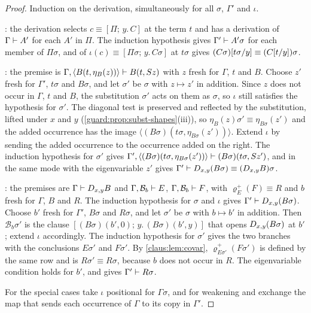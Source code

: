 \begin{proof}
Induction on the derivation, simultaneously for all $\sigma$, $\Gamma'$
and $\iota$.

: the derivation selects $c\equiv[\Pi;\,y.\,C]$ at the term
$t$ and has a derivation of $\Gamma\vdash A'$ for each $A'$ in $\Pi$. The
induction hypothesis gives $\Gamma'\vdash A'\sigma$ for each member of
$\Pi\sigma$, and  of $\iota(c)\equiv[\Pi\sigma;\,y.\,C\sigma]$
at $t\sigma$ gives $(C\sigma)[t\sigma/y]\equiv(C[t/y])\sigma$.

: the premise is
$\Gamma,\langle B(t,\eta_B(z))\rangle\vdash B(t,S z)$ with $z$ fresh
for $\Gamma$, $t$ and $B$. Choose $z'$ fresh for $\Gamma'$, $t\sigma$ and
$B\sigma$, and let $\sigma'$ be $\sigma$ with $z\mapsto z'$ in addition.
Since $z$ does not occur in $\Gamma$, $t$ and $B$, the substitution
$\sigma'$ acts on them as $\sigma$, so $\iota$ still satisfies the
hypothesis for $\sigma'$. The diagonal test is preserved and reflected by
the substitution, lifted under $x$ and $y$
(\cref{guard:prop:subst-shapes}(iii)), so
$\eta_B(z)\sigma'\equiv\eta_{B\sigma}(z')$ and the added occurrence has the
image $\langle(B\sigma)(t\sigma,\eta_{B\sigma}(z'))\rangle$. Extend
$\iota$ by sending the added occurrence to the occurrence added on the
right. The induction hypothesis for $\sigma'$ gives
$\Gamma',\langle(B\sigma)(t\sigma,\eta_{B\sigma}(z'))\rangle\vdash
(B\sigma)(t\sigma,S z')$, and  in the same mode with
the eigenvariable $z'$ gives $\Gamma'\vdash D_{x,y}(B\sigma)\equiv
(D_{x,y}B)\sigma$.

: the premises are $\Gamma\vdash D_{x,y}B$ and
$\Gamma,\mathcal{B}_b\vdash E$, $\Gamma,\mathcal{B}_b\vdash F$, with
$\varrho^{+}_E(F)\equiv R$ and $b$ fresh for $\Gamma$, $B$ and $R$. The
induction hypothesis for $\sigma$ and $\iota$ gives
$\Gamma'\vdash D_{x,y}(B\sigma)$. Choose $b'$ fresh for $\Gamma'$,
$B\sigma$ and $R\sigma$, and let $\sigma'$ be $\sigma$ with $b\mapsto b'$
in addition. Then $\mathcal{B}_b\sigma'$ is the clause
$[(B\sigma)(b',0);\,y.\,(B\sigma)(b',y)]$ that opens $D_{x,y}(B\sigma)$
at $b'$; extend $\iota$ accordingly. The induction hypothesis for
$\sigma'$ gives the two branches with the conclusions $E\sigma'$ and
$F\sigma'$. By \cref{claus:lem:covar},
$\varrho^{+}_{E\sigma'}(F\sigma')$ is defined by the same row and is
$R\sigma'\equiv R\sigma$, because $b$ does not occur in $R$. The
eigenvariable condition holds for $b'$, and  gives
$\Gamma'\vdash R\sigma$.

For the special cases take $\iota$ positional for $\Gamma\sigma$, and for
weakening and exchange the map that sends each occurrence of $\Gamma$ to
its copy in $\Gamma'$.
\end{proof}

